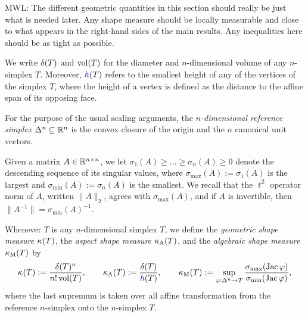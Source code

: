\documentclass[10pt,a4paper]{article}
\newcommand{\mwl}[1]{{\color{red}#1}}
\begin{document}
\mwl{MWL: The different geometric quantities in this section should really be just what is needed later. Any shape measure should be locally measurable and close to what appears in the right-hand sides of the main results. Any inequalities here should be as tight as possible. }

We write ${\delta}(T)$ and $\operatorname{vol}(T)$ for the diameter and $n$-dimensional volume of any $n$-simplex $T$.
Moreover, $\height(T)$ refers to the smallest height of any of the vertices of the simplex $T$,
where the height of a vertex is defined as the distance to the affine span of its opposing face.

For the purpose of the usual scaling arguments, the \emph{$n$-dimensional reference simplex} $\Delta^n \subseteq {\mathbb R}^n$ is the convex closure of the origin and the $n$ canonical unit vectors. 

Given a matrix $A \in {\mathbb R}^{n \times n}$, we let $\sigma_{1}(A) \geq \dots \geq \sigma_{n}(A) \geq 0$ denote the descending sequence of its singular values, 
where $\sigma_{\max}(A) := \sigma_{1}(A)$ is the largest and $\sigma_{\min}(A) := \sigma_{n}(A)$ is the smallest. 
We recall that the $\ell^{2}$ operator norm of $A$, written $\| A \|_{2}$, agrees with $\sigma_{\max}(A)$,
and if $A$ is invertible, then $\|A^{-1}\| = \sigma_{\min}(A)^{-1}$.

Whenever $T$ is any $n$-dimensional simplex $T$,
we define the \textit{geometric shape measure} $\kappa_{}(T)$,
the \textit{aspect shape measure} $\kappa_{\rm A}(T)$,
and 
the \textit{algebraic shape measure} $\kappa_{\rm M}(T)$
by 
\begin{align}\label{math:shapemeasure}
    \geometricshapemeasure(T)
    := 
    \frac{ \diam(T)^{n} }{ n! \vol(T) }
    ,
    \qquad 
    \aspectratio(T)
    := 
    \frac{ \diam(T) }{ \height(T) }
    ,
    \qquad 
    \algebraicshapemeasure(T)
    := 
    \sup_{ \varphi : \Delta^n \rightarrow T } 
    \frac{ \sigma_{\max}( \Jacobian \varphi ) }{ \sigma_{\min}( \Jacobian \varphi ) }
    ,
\end{align}
where the last supremum is taken over all affine transformation from the reference $n$-simplex onto the $n$-simplex $T$. 
\end{document}
